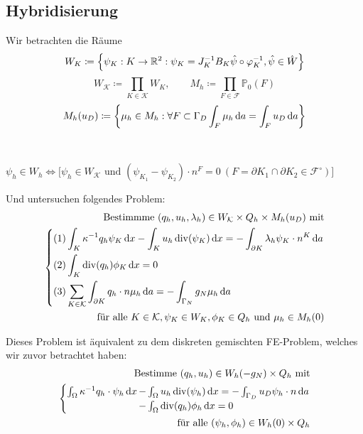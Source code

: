 \subsection{Hybridisierung}

Wir betrachten die Räume
\[W_K \coloneqq \left\{ \psi_K:K \to \mathbb{R}^2: \psi_K = J_K^{-1}  B_K \hat{\psi} \circ \varphi_K^{-1}, \hat{\psi} \in \hat{W} \right\} \]
\[ W_\mathcal{K} \coloneqq \prod_{K \in \mathcal{K}} W_K, \qquad M_h \coloneqq \prod_{F \in \mathcal{F}} \mathbb{P}_0(F) \]
\[ M_h(u_D) \coloneqq \left\{ \mu_h \in M_h:\forall  F \subset \Gamma_D \int_F \mu_h \, \mathrm{d} a = \int_F u_D \, \mathrm{d} a  \right\}\]

\begin{Bemerkung}~
	
	$ \psi_h \in W_h \iff \big[ \psi_h \in W_{\mathcal{K}} \text{ und }  (\psi_{K_1} - \psi_{K_2}) \cdot n^F = 0 \ (F= \partial K_1 \cap \partial K_2 \in \mathcal{F}^{\circ})\big] $
\end{Bemerkung}


Und untersuchen folgendes Problem:
\begin{align*}
\text{Bestimmme } (q_h,u_h, \lambda_h) \in W_\mathcal{K} \times Q_h \times M_h(u_D) \text{ mit}\\
\begin{dcases}
(1) \int_K \kappa^{-1} q_h \psi_K \, \mathrm{d} x - \int_K u_h \operatorname{div}(\psi_K) \, \mathrm{d} x = - \int_{\partial K} \lambda_h \psi_K \cdot n^K \, \mathrm{d} a \\
(2) \int_K \operatorname{div}(q_h) \phi_K \, \mathrm{d} x = 0\\
(3) \sum_{K\in \mathcal{K}} \int_{\partial K} q_h \cdot n \mu_h \, \mathrm{d} a = - \int_{\Gamma_N} g_N \mu_h \, \mathrm{d} a
\end{dcases}\\
\text{für alle } K \in \mathcal{K}, \psi_K \in W_K, \phi_K \in Q_h  \text{ und } \mu_h \in M_h(0)
\end{align*}

Dieses Problem ist äquivalent zu dem diskreten gemischten FE-Problem, welches wir zuvor betrachtet haben:
\begin{align*}
\text{Bestimme } (q_h,u_h) \in W_h(-g_N) \times Q_h \text{ mit}\\
\begin{cases}
\int_{\Omega} \kappa ^{-1} q_h \cdot \psi_h \, \mathrm{d} x \mkern-15mu &- \int_{\Omega} u_h \operatorname{div}(\psi_h) \, \mathrm{d} x = - \int_{\Gamma_D} u_D \psi_h \cdot n \, \mathrm{d} a\\
&- \int_{\Omega} \operatorname{div}(q_h) \phi_h \, \mathrm{d} x = 0
\end{cases} \\
\text{für alle } (\psi_h, \phi_h) \in W_h(0) \times Q_h
\end{align*}

